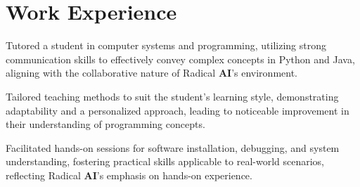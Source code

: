 \begin{minipage}[t]{0.63\textwidth}
  \section{Work Experience}
    \vspace{5pt}
    \begin{tightemize}
      \item Tutored a student in computer systems and programming, utilizing strong communication skills to effectively convey complex concepts in Python and Java, aligning with the collaborative nature of Radical \textbf{AI}'s environment.
      \item Tailored teaching methods to suit the student's learning style, demonstrating adaptability and a personalized approach, leading to noticeable improvement in their understanding of programming concepts.
      \item Facilitated hands-on sessions for software installation, debugging, and system understanding, fostering practical skills applicable to real-world scenarios, reflecting Radical \textbf{AI}'s emphasis on hands-on experience.
    \end{tightemize}
  \sectionsep
  \end{minipage}


